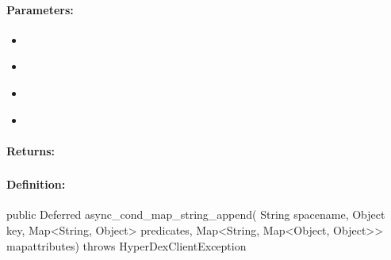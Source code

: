 \paragraph{Parameters:}
\begin{itemize}[noitemsep]
\item {}\\

\item {}\\

\item {}\\

\item {}\\

\end{itemize}

\paragraph{Returns:}


\pagebreak
\subsubsection{}
\label{api:java:async_cond_map_string_append}


\paragraph{Definition:}
\begin{javacode}
public Deferred async_cond_map_string_append(
        String spacename,
        Object key,
        Map<String, Object> predicates,
        Map<String, Map<Object, Object>> mapattributes) throws HyperDexClientException
\end{javacode}

